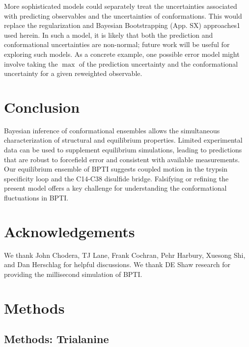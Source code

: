 \documentclass[journal=jacsat,manuscript=article]{achemso}
\begin{document}
More sophisticated models could separately treat the uncertainties associated with predicting observables and the uncertainties of conformations.  This would replace the regularization and Bayesian Bootstrapping (App. SX) approaches1 used herein.  In such a model, it is likely that both the prediction and conformational uncertainties are non-normal; future work will be useful for exploring such models.  As a concrete example, one possible error model might involve taking the $\max$ of the prediction uncertainty and the conformational uncertainty for a given reweighted observable.  


\section{Conclusion}

Bayesian inference of conformational ensembles allows the simultaneous characterization of structural and equilibrium properties.  Limited experimental data can be used to supplement equilibrium simulations, leading to predictions that are robust to forcefield error and consistent with available measurements.  Our equilibrium ensemble of BPTI suggests coupled motion in the trypsin specificity loop and the C14-C38 disulfide bridge.  Falsifying or refining the present model offers a key challenge for understanding the conformational fluctuations in BPTI.

\section{Acknowledgements}

We thank John Chodera, TJ Lane, Frank Cochran, Pehr Harbury, Xuesong Shi, and Dan Herschlag for helpful discussions.  We thank DE Shaw research for providing the millisecond simulation of BPTI.  

\section{Methods}

\subsection{Methods: Trialanine}
\end{document}
